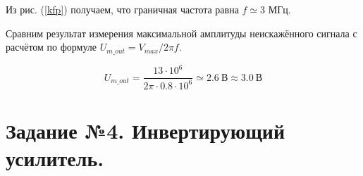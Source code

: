 \documentclass[a4paper, 12pt, twoside]{article}
\begin{document}
Из рис. (\ref{kfp}) получаем, что граничная частота равна $f \simeq 3$ МГц.
\vspace{\baselineskip}

Сравним результат измерения максимальной амплитуды неискажённого сигнала с расчётом по формуле $U_{m\_out} = V_{max}/2\pi f$.
\vspace{\baselineskip}

$$ U_{m\_out} = \dfrac{ 13\cdot 10^6}{2\pi \cdot 0.8 \cdot 10^6} \simeq  2.6~\text{В} \approx 3.0 ~ \text{В}$$ 

\section*{Задание №4. Инвертирующий усилитель.}
\end{document}
